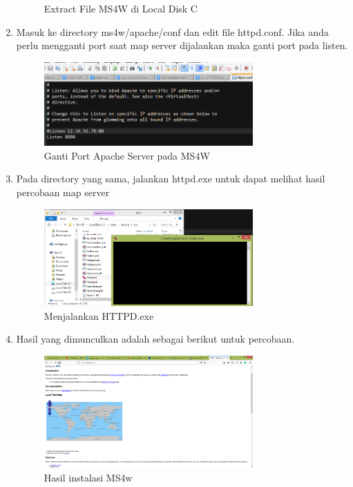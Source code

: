 \begin{enumerate}
\begin{figure}[H]
		\centering
		\caption{Extract File MS4W di Local Disk C}
	\end{figure}
    \item Masuk ke directory ms4w/apache/conf dan edit file httpd.conf. Jika anda perlu mengganti port saat map server dijalankan maka ganti port pada listen.
    \hfill\break
	\begin{figure}[H]
		\includegraphics[width=8cm]{figures/1174035/tugas4/mapserver_3.png}
		\centering
		\caption{Ganti Port Apache Server pada MS4W}
	\end{figure}
    \item Pada directory yang sama, jalankan httpd.exe untuk dapat melihat hasil percobaan map server
    \hfill\break
	\begin{figure}[H]
		\includegraphics[width=8cm]{figures/1174035/tugas4/mapserver_4.png}
		\centering
		\caption{Menjalankan HTTPD.exe}
	\end{figure}
    \item Hasil yang dimunculkan adalah sebagai berikut untuk percobaan.
    \hfill\break
	\begin{figure}[H]
		\includegraphics[width=8cm]{figures/1174035/tugas4/mapserver_5.png}
		\centering
		\caption{Hasil instalasi MS4w}
	\end{figure}
\end{enumerate}
